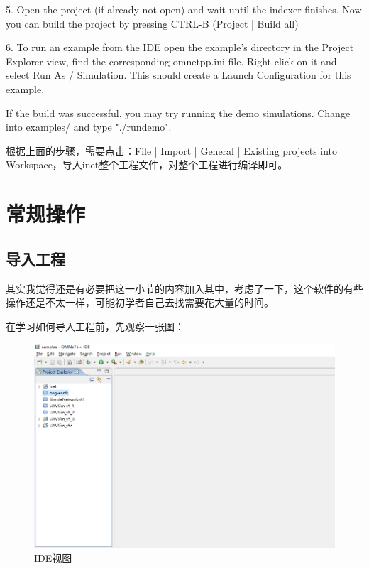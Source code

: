 \begin{itemize}
\begin{definition}
	5. Open the project (if already not open) and wait until the indexer finishes.
	Now you can build the project by pressing CTRL-B (Project | Build all)
	
	6. To run an example from the IDE open the example's directory in the Project Explorer view,
	find the corresponding omnetpp.ini file. Right click on it and select Run As / Simulation.
	This should create a Launch Configuration for this example.
	
	If the build was successful, you may try running the demo simulations.
	Change into examples/ and type "./rundemo".
\end{definition}
根据上面的步骤，需要点击：File | Import | General | Existing projects into Workspace，导入inet整个工程文件，对整个工程进行编译即可。\\
	
\end{itemize}


\section{常规操作}
\subsection{导入工程}
其实我觉得还是有必要把这一小节的内容加入其中，考虑了一下，这个软件的有些操作还是不太一样，可能初学者自己去找需要花大量的时间。

在学习如何导入工程前，先观察一张图：

\begin{figure}	
	\centering
	\includegraphics[width=\textwidth]{../img/chapter2/IDE}
	\caption{IDE视图}\label{fig:1a}
\end{figure}

